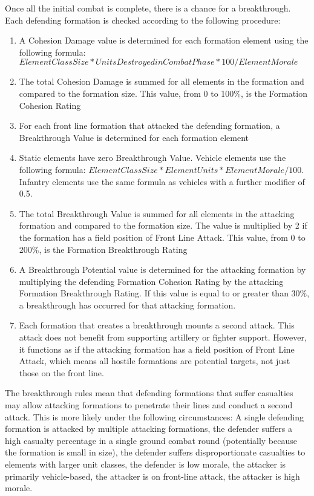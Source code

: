 \documentclass[../../Aurora C# unofficial manual.tex]{subfiles}
\begin{document}
	Once all the initial combat is complete, there is a chance for a breakthrough. Each defending formation is checked according to the following procedure:
	\begin{enumerate}
		\item A Cohesion Damage value is determined for each formation element using the following formula: \( Element Class Size * Units Destroyed in Combat Phase * 100 / Element Morale \)
		\item The total Cohesion Damage is summed for all elements in the formation and compared to the formation size. This value, from 0 to 100\%, is the Formation Cohesion Rating
		\item For each front line formation that attacked the defending formation, a Breakthrough Value is determined for each formation element
		\item Static elements have zero Breakthrough Value. Vehicle elements use the following formula: \( Element Class Size * Element Units * Element Morale / 100 \). Infantry elements use the same formula as vehicles with a further modifier of 0.5.
		\item The total Breakthrough Value is summed for all elements in the attacking formation and compared to the formation size. The value is multiplied by 2 if the formation has a field position of Front Line Attack. This value, from 0 to 200\%, is the Formation Breakthrough Rating
		\item A Breakthrough Potential value is determined for the attacking formation by multiplying the defending Formation Cohesion Rating by the attacking Formation Breakthrough Rating. If this value is equal to or greater than 30\%, a breakthrough has occurred for that attacking formation.
		\item Each formation that creates a breakthrough mounts a second attack. This attack does not benefit from supporting artillery or fighter support. However, it functions as if the attacking formation has a field position of Front Line Attack, which means all hostile formations are potential targets, not just those on the front line.
	\end{enumerate}
	
	The breakthrough rules mean that defending formations that suffer casualties may allow attacking formations to penetrate their lines and conduct a second attack. This is more likely under the following circumstances: A single defending formation is attacked by multiple attacking formations, the defender suffers a high casualty percentage in a single ground combat round (potentially because the formation is small in size), the defender suffers disproportionate casualties to elements with larger unit classes, the defender is low morale, the attacker is primarily vehicle-based, the attacker is on front-line attack, the attacker is high morale.
	
\end{document}
